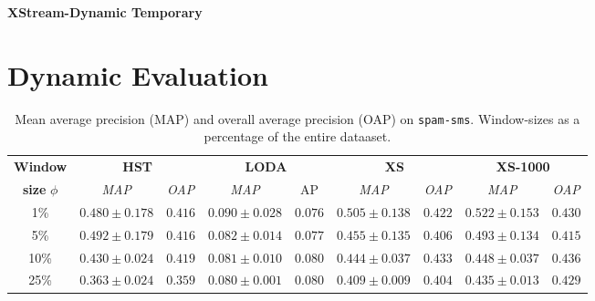 \documentclass[11pt,onecolumn]{article}
\begin{document}
\textbf{\huge{XStream-Dynamic Temporary}}

\section{Dynamic Evaluation}

\begin{table}[htp!]
    \centering
    \begin{tabular}{ccccccccc}
    \toprule
    \textbf{Window} & \multicolumn{2}{c}{\textbf{HST}} & \multicolumn{2}{c}{\textbf{LODA}} & \multicolumn{2}{c}{\textbf{XS}} & \multicolumn{2}{c}{\textbf{XS-1000}} \\
    \textbf{size} $\phi$ & \textit{MAP} & \textit{OAP} & \textit{MAP}& AP     & \textit{MAP} & \textit{OAP} & \textit{MAP} & \textit{OAP}	\\
    \midrule
    1\%  & $0.480 \pm 0.178$ & $0.416$ & $0.090 \pm 0.028$ & $0.076$ & $0.505 \pm 0.138$ & $0.422$ &	$0.522 \pm 0.153$ & $0.430$ \\
    5\% & $0.492 \pm 0.179$ & $0.416$ & $0.082 \pm 0.014$ & $0.077$ & $0.455 \pm 0.135$ & $0.406$ &$0.493 \pm 0.134$ & $0.415$	\\
    10\% & $0.430 \pm 0.024$ & $0.419$ & $0.081 \pm 0.010$ & $0.080$ & $0.444 \pm 0.037$ & $0.433$ &$0.448 \pm 0.037$ & $0.436$	\\
    25\% & $0.363 \pm 0.024$ & $0.359$ & $0.080 \pm 0.001$ & $0.080$ & $0.409 \pm 0.009$ & $0.404$ &$0.435 \pm 0.013$ & $0.429$	\\
    \bottomrule
    \end{tabular}
    \caption{Mean average precision (MAP) and overall average precision (OAP) on \texttt{spam-sms}. Window-sizes as a percentage of the entire dataaset.}
\end{table}
\end{document}
